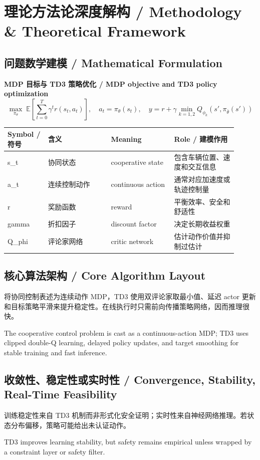 \documentclass[UTF8,a4paper,11pt,fontset=fandol]{ctexart}
\begin{document}
\section{理论方法论深度解构 / Methodology \& Theoretical Framework}
\subsection{问题数学建模 / Mathematical Formulation}
\textbf{MDP 目标与 TD3 策略优化 / MDP objective and TD3 policy optimization}
\[
\max_{\pi_\theta}\; \mathbb{E}\left[\sum_{t=0}^{T}\gamma^t r(s_t,a_t)\right],\quad a_t=\pi_\theta(s_t),\quad y=r+\gamma\min_{k=1,2}Q_{\phi_k}(s',\pi_{\bar\theta}(s'))
\]
\begin{longtable}{p{0.16\linewidth}p{0.25\linewidth}p{0.25\linewidth}p{0.25\linewidth}}
\toprule
Symbol / 符号 & 含义 & Meaning & Role / 建模作用\\
\midrule
s\_t & 协同状态 & cooperative state & 包含车辆位置、速度和交互信息 \\
a\_t & 连续控制动作 & continuous action & 通常对应加速度或轨迹控制量 \\
r & 奖励函数 & reward & 平衡效率、安全和舒适性 \\
gamma & 折扣因子 & discount factor & 决定长期收益权重 \\
Q\_phi & 评论家网络 & critic network & 估计动作价值并抑制过估计 \\
\bottomrule
\end{longtable}

\subsection{核心算法架构 / Core Algorithm Layout}
将协同控制表述为连续动作 MDP，TD3 使用双评论家取最小值、延迟 actor 更新和目标策略平滑来提升稳定性。在线执行时只需前向传播策略网络，因而推理很快。

The cooperative control problem is cast as a continuous-action MDP; TD3 uses clipped double-Q learning, delayed policy updates, and target smoothing for stable training and fast inference.

\subsection{收敛性、稳定性或实时性 / Convergence, Stability, Real-Time Feasibility}
训练稳定性来自 TD3 机制而非形式化安全证明；实时性来自神经网络推理。若状态分布偏移，策略可能给出未认证动作。

TD3 improves learning stability, but safety remains empirical unless wrapped by a constraint layer or safety filter.
\end{document}
